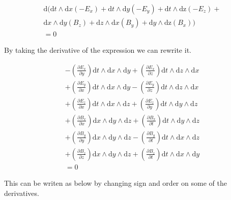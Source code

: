 \begin{gather*}
\mathrm{d}(\mathrm{d}t \wedge \mathrm{d}x(-E_x)+\mathrm{d}t \wedge \mathrm{d}y(-E_y)+\mathrm{d}t \wedge \mathrm{dz}(-E_z) + \\\mathrm{d}x \wedge \mathrm{d}y(B_z)+\mathrm{d}z \wedge \mathrm{d}x(B_y)+\mathrm{d}y \wedge \mathrm{dz}(B_x))\\
=0
\end{gather*}

By taking the derivative of the expression we can rewrite it. 

\begin{gather*}
-(\frac{\partial E_x}{\partial y}) \mathrm{d}t \wedge \mathrm{d}x \wedge \mathrm{d}y+ (\frac{\partial E_x}{\partial z}) \mathrm{d}t \wedge \mathrm{d}z \wedge \mathrm{d}x\\ + (\frac{\partial E_y}{\partial x}) \mathrm{d}t \wedge \mathrm{d}x \wedge \mathrm{d}y- (\frac{\partial E_y}{\partial z}) \mathrm{d}t \wedge \mathrm{d}z \wedge \mathrm{d}x\\+
(\frac{\partial E_z}{\partial x}) \mathrm{d}t \wedge \mathrm{d}x \wedge \mathrm{d}z
+ (\frac{\partial E_z}{\partial y}) \mathrm{d}t \wedge \mathrm{d}y \wedge \mathrm{d}z\\
+ (\frac{\partial B_x}{\partial x}) \mathrm{d}x \wedge \mathrm{d}y \wedge \mathrm{d}z
+ (\frac{\partial B_x}{\partial t}) \mathrm{d}t \wedge \mathrm{d}y \wedge \mathrm{d}z\\
+ (\frac{\partial B_y}{\partial y}) \mathrm{d}x \wedge \mathrm{d}y \wedge \mathrm{d}z
- (\frac{\partial B_y}{\partial t}) \mathrm{d}t \wedge \mathrm{d}x \wedge \mathrm{d}z \\
+ (\frac{\partial B_z}{\partial z}) \mathrm{d}x \wedge \mathrm{d}y \wedge \mathrm{d}z
+(\frac{\partial B_z}{\partial t}) \mathrm{d}t \wedge \mathrm{d}x \wedge \mathrm{d}y \\
=0
\end{gather*}

This can be writen as below by changing sign and order on some of the derivatives. 

